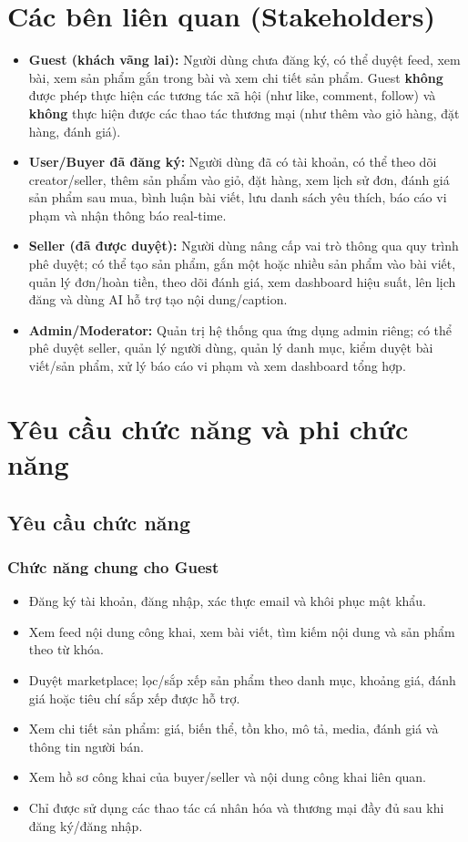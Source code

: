 \section{Các bên liên quan (Stakeholders)}
\begin{itemize}
    \item \textbf{Guest (khách vãng lai):} Người dùng chưa đăng ký, có thể duyệt feed, xem bài, xem sản phẩm gắn trong bài và xem chi tiết sản phẩm. Guest \textbf{không} được phép thực hiện các tương tác xã hội (như like, comment, follow) và \textbf{không} thực hiện được các thao tác thương mại (như thêm vào giỏ hàng, đặt hàng, đánh giá).
    \item \textbf{User/Buyer đã đăng ký:} Người dùng đã có tài khoản, có thể theo dõi creator/seller, thêm sản phẩm vào giỏ, đặt hàng, xem lịch sử đơn, đánh giá sản phẩm sau mua, bình luận bài viết, lưu danh sách yêu thích, báo cáo vi phạm và nhận thông báo real-time.
    \item \textbf{Seller (đã được duyệt):} Người dùng nâng cấp vai trò thông qua quy trình phê duyệt; có thể tạo sản phẩm, gắn một hoặc nhiều sản phẩm vào bài viết, quản lý đơn/hoàn tiền, theo dõi đánh giá, xem dashboard hiệu suất, lên lịch đăng và dùng AI hỗ trợ tạo nội dung/caption.
    \item \textbf{Admin/Moderator:} Quản trị hệ thống qua ứng dụng admin riêng; có thể phê duyệt seller, quản lý người dùng, quản lý danh mục, kiểm duyệt bài viết/sản phẩm, xử lý báo cáo vi phạm và xem dashboard tổng hợp.
\end{itemize}

\section{Yêu cầu chức năng và phi chức năng}

\subsection{Yêu cầu chức năng}

\subsubsection{Chức năng chung cho Guest}
\begin{itemize}
    \item Đăng ký tài khoản, đăng nhập, xác thực email và khôi phục mật khẩu.
    \item Xem feed nội dung công khai, xem bài viết, tìm kiếm nội dung và sản phẩm theo từ khóa.
    \item Duyệt marketplace; lọc/sắp xếp sản phẩm theo danh mục, khoảng giá, đánh giá hoặc tiêu chí sắp xếp được hỗ trợ.
    \item Xem chi tiết sản phẩm: giá, biến thể, tồn kho, mô tả, media, đánh giá và thông tin người bán.
    \item Xem hồ sơ công khai của buyer/seller và nội dung công khai liên quan.
    \item Chỉ được sử dụng các thao tác cá nhân hóa và thương mại đầy đủ sau khi đăng ký/đăng nhập.
\end{itemize}

